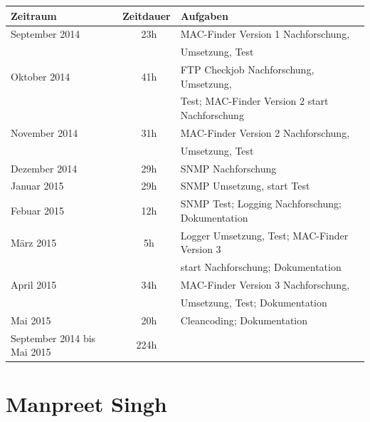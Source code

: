 \documentclass[12pt,a4paper]{report}
\begin{document}
\begin{onehalfspace}
\begin{tabular}{|l|c|l|}
\hline
\textbf{Zeitraum} & \textbf{Zeitdauer} & \textbf{Aufgaben} \\ \hline \hline
September 2014 & ~23h & MAC-Finder Version 1 Nachforschung, \\&& Umsetzung, Test\\ \hline
Oktober 2014 & ~41h & FTP Checkjob Nachforschung, Umsetzung,\\&& Test; MAC-Finder Version 2 start Nachforschung\\ \hline
November 2014 & ~31h & MAC-Finder Version 2 Nachforschung,\\&& Umsetzung, Test\\ \hline
Dezember 2014 & ~29h & SNMP Nachforschung\\ \hline
Januar 2015 & ~29h & SNMP Umsetzung, start Test\\ \hline
Febuar 2015 & ~12h & SNMP Test; Logging Nachforschung; Dokumentation\\ \hline
März 2015 & ~5h & Logger Umsetzung, Test; MAC-Finder Version 3\\&& start Nachforschung; Dokumentation\\ \hline
April 2015 & ~34h & MAC-Finder Version 3 Nachforschung,\\&& Umsetzung, Test; Dokumentation\\ \hline
Mai 2015 & ~20h & Cleancoding; Dokumentation\\
\hline \hline
September 2014 bis Mai 2015 & 224h &\\ \hline
\end{tabular}

\chapter{Manpreet Singh}
\begin{tabular}{|l|c|l|}


\end{tabular}
\end{onehalfspace}
\end{document}
